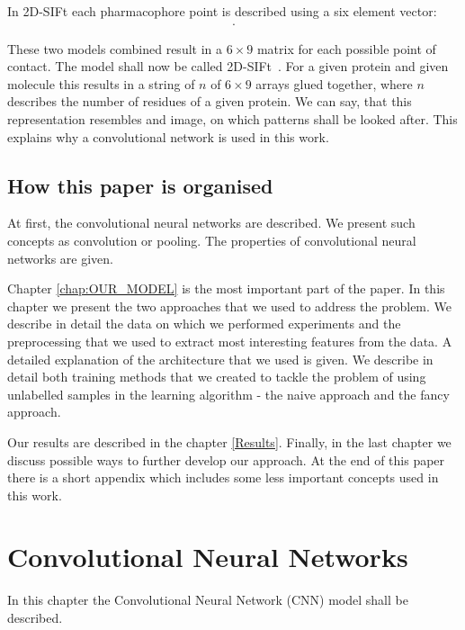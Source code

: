 \documentclass[a4paper,10pt]{report}
\begin{document}
    In 2D-SIFt each pharmacophore point is described using a six element vector:
    \begin{align*}
    [\text{H-bond donor},&\text{H-bond acceptor},\text{hydrophobic}, \\
    &\text{negatively charged},\text{positively charged},\text{aromatic}].
    \end{align*}



    These two models combined result in a $6\times{}9$ matrix for each possible point of contact. The model shall now be called 2D-SIFt~\cite{Mordalski2011}. For a given protein and given molecule this results in a string of $n$ of $6\times{}9$ arrays glued together, where $n$ describes the number of residues of a given protein. We can say, that this representation resembles and image, on which patterns shall be looked after. This explains why a convolutional network is used in this work.
      
   
    \section{How this paper is organised}
    
    At first, the convolutional neural networks are described. We present such concepts as convolution or pooling. The properties of convolutional neural networks are given. 
    
    Chapter \ref{chap:OUR_MODEL} is the most important part of the paper. In this chapter we present the two approaches that we used to address the problem. We describe in detail the data on which we performed experiments and the preprocessing that we used to extract most interesting features from the data. A detailed explanation of the architecture that we used is given. We describe in detail both training methods that we created to tackle the problem of using unlabelled samples in the learning algorithm - the naive approach and the fancy approach. 
    
    Our results are described in the chapter \ref{Results}. Finally, in the last chapter we discuss possible ways to further develop our approach. At the end of this paper there is a short appendix which includes some less important concepts used in this work.
    

  \chapter{Convolutional Neural Networks}
  In this chapter the Convolutional Neural Network (CNN) model shall be described.
  
\end{document}
